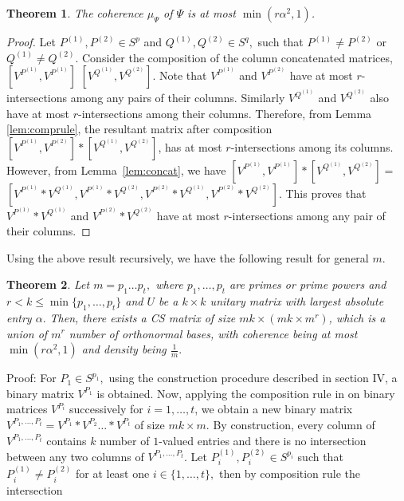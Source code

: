 \documentclass{IEEEtran}
\newtheorem{theorem}{Theorem}[section]
\begin{document}
\begin{theorem}
  The coherence $\mu_{\Psi}$ of $\Psi$ is at most
  $\min(r\alpha^{2},1)$.
\end{theorem}
\begin{proof}
Let $P^{(1)},P^{(2)}\in S^{p}$ and  $Q^{(1)},Q^{(2)}\in S^{q},$ such that
$P^{(1)} \neq P^{(2)}$ or $Q^{(1)} \neq Q^{(2)}$. Consider the
composition of the column concatenated matrices, $[V^{P^{(1)}}, V^{P^{(1)}}]$
$[V^{Q^{(1)}},V^{Q^{(2)}}]$. Note that $V^{P^{(1)}}$ and $V^{P^{(2)}}$ have at most
$r$-intersections among any pairs of their columns. Similarly $V^{Q^{(1)}}$ and
$V^{Q^{(2)}}$ also have at most $r$-intersections among their columns.
Therefore, from Lemma \ref{lem:comprule}, the resultant matrix after
composition $[V^{P^{(1)}}, V^{P^{(2)}}] * [V^{Q^{(1)}},V^{Q^{(2)}}]$,
has at most $r$-intersections among its columns. However, from
Lemma~\ref{lem:concat}, we have $[V^{P^{(1)}}, V^{P^{(1)}}] \ast [V^{Q^{(1)}},V^{Q^{(2)}}] =$
$[V^{P^{(1)}}\ast V^{Q^{(1)}},V^{P^{(1)}}\ast V^{Q^{(2)}},V^{P^{(2)}} \ast V^{Q^{(1)}},V^{P^{(2)}} \ast V^{Q^{(2)}}]$. This proves that
$V^{P^{(1)}}\ast V^{Q^{(1)}}$ and $V^{P^{(2)}}\ast V^{Q^{(2)}}$ have at most
$r$-intersections among any pair of their columns.
\end{proof}
Using the above result recursively, we have the following result for
general $m$.
\begin{theorem}
  Let $m=p_{1}\dots p_{t},$ where $p_{1},\dots , p_{t}$ are primes or prime powers
  and $r<k\leq \min \{p_{1},\dots ,p_{t}\}$ and $U$ be a $k\times k$ unitary matrix with largest absolute entry $\alpha.$ Then, there
  exists a CS matrix of size $mk\times (mk\times m^{r})$, which is a
  union of $m^{r}$ number of orthonormal bases, with coherence being at
  most $\min(r\alpha^{2},1)$ and density being $\frac{1}{m}.$  
\end{theorem}
Proof: For $P_{1}\in S^{p_{1}},$ using the construction procedure described in section IV,  a binary matrix $V^{P_{1}}$ is obtained. Now, applying the composition
rule in \cite{pra_2016} on binary
matrices $V^{P_{i}}$ successively for $i=1, \dots, t$, we obtain a new binary matrix
$V^{P_{1},\dots,P_{t}}=V^{P_{1}}\ast V^{P_{2}} \dots \ast V^{P_{t}}$ of size $mk \times m.$ By construction, every column of $V^{P_{1},\dots,P_{t}}$ contains $k$ number of $1$-valued
entries and there is no intersection between any two columns of
$V^{P_{1},\dots,P_{t}}.$
Let $P^{(1)}_{i}, P^{(2)}_{i}\in S^{p_{i}}$ such that $P^{(1)}_{i} \neq P^{(2)}_{i}$
for at least one $i\in \{1,\dots, t\},$ then by composition rule the intersection
\end{document}
